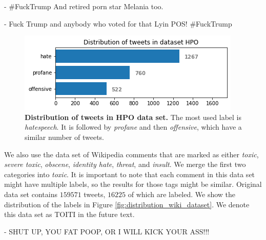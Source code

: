 \documentclass[fleqn,moreauthors,10pt]{ds_report}
\newcommand\bm{0.2pt}
\begin{document}
\begin{tcolorbox}[width=0.9\linewidth, center,arc=8pt,sharp corners=downhill, boxrule=0.3pt, left=\bm, top=\bm, right=\bm, bottom=\bm, fontupper=\small]
 - \#FuckTrump And retired porn star Melania too.
\end{tcolorbox}

\begin{tcolorbox}[width=0.9\linewidth, center,arc=8pt,sharp corners=downhill, boxrule=0.3pt, left=\bm, top=\bm, right=\bm, bottom=\bm, fontupper=\small]
 - Fuck Trump and anybody who voted for that Lyin POS!  \#FuckTrump
\end{tcolorbox}

\begin{figure}[ht]\centering
	\includegraphics[width=\linewidth]{distribution_tweets_hpo.png}
	\caption{\textbf{Distribution of tweets in HPO data set.} The most used label is \textit{hatespeech}. It is followed by \textit{profane} and then \textit{offensive}, which have a similar number of tweets.}
	\label{fig:distribution_tweets_hpo}
\end{figure}

\noindent We also use the data set of Wikipedia comments \cite{dixon2017ex} that are marked as either \textit{toxic}, \textit{severe toxic}, \textit{obscene}, \textit{identity hate}, \textit{threat}, and \textit{insult}. We merge the first two categories into \textit{toxic}. It is important to note that each comment in this data set might have multiple labels, so the results for those tags might be similar. Original data set contains $159571$ tweets, $16225$ of which are labeled. We show the distribution of the labels in Figure \ref{fig:distribution_wiki_dataset}. We denote this data set as TOITI in the future text.

\begin{tcolorbox}[width=0.9\linewidth, center,arc=8pt,sharp corners=downhill, boxrule=0.3pt, left=\bm, top=\bm, right=\bm, bottom=\bm, fontupper=\small]
 - SHUT UP, YOU FAT POOP, OR I WILL KICK YOUR ASS!!!
\end{tcolorbox}
\end{document}
